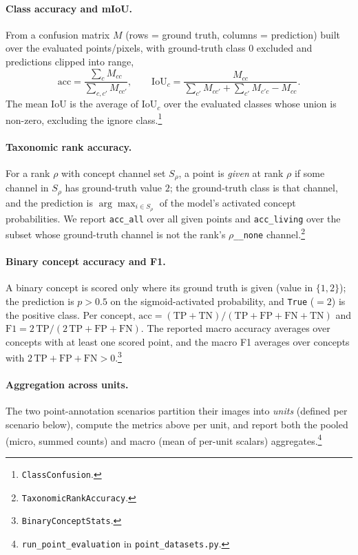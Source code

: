 \paragraph{Class accuracy and mIoU.}
From a confusion matrix $M$ (rows = ground truth, columns = prediction) built
over the evaluated points/pixels, with ground-truth class $0$ excluded and
predictions clipped into range,
\begin{equation}
\mathrm{acc} = \frac{\sum_c M_{cc}}{\sum_{c,c'} M_{cc'}},
\qquad
\mathrm{IoU}_c = \frac{M_{cc}}{\sum_{c'} M_{cc'} + \sum_{c'} M_{c'c} - M_{cc}} .
\end{equation}
The mean IoU is the average of $\mathrm{IoU}_c$ over the evaluated classes whose
union is non-zero, excluding the ignore class.\footnote{\texttt{ClassConfusion}.}

\paragraph{Taxonomic rank accuracy.}
For a rank $\rho$ with concept channel set $S_\rho$, a point is \emph{given} at
rank $\rho$ if some channel in $S_\rho$ has ground-truth value $2$; the
ground-truth class is that channel, and the prediction is
$\arg\max_{i\in S_\rho}$ of the model's activated concept probabilities. We
report \texttt{acc\_all} over all given points and \texttt{acc\_living} over the
subset whose ground-truth channel is not the rank's \texttt{$\rho$\_\_none}
channel.\footnote{\texttt{TaxonomicRankAccuracy}.}

\paragraph{Binary concept accuracy and F1.}
A binary concept is scored only where its ground truth is given (value in
$\{1,2\}$); the prediction is $p>0.5$ on the sigmoid-activated probability, and
\texttt{True} ($=2$) is the positive class. Per concept,
$\mathrm{acc}=(\mathrm{TP}+\mathrm{TN})/(\mathrm{TP}+\mathrm{FP}+\mathrm{FN}+\mathrm{TN})$
and $\mathrm{F1}=2\,\mathrm{TP}/(2\,\mathrm{TP}+\mathrm{FP}+\mathrm{FN})$. The
reported macro accuracy averages over concepts with at least one scored point,
and the macro F1 averages over concepts with $2\,\mathrm{TP}+\mathrm{FP}+\mathrm{FN}>0$.\footnote{\texttt{BinaryConceptStats}.}

\paragraph{Aggregation across units.}
The two point-annotation scenarios partition their images into \emph{units}
(defined per scenario below), compute the metrics above per unit, and report
both the pooled (micro, summed counts) and macro (mean of per-unit scalars)
aggregates.\footnote{\texttt{run\_point\_evaluation} in
\texttt{point\_datasets.py}.}


